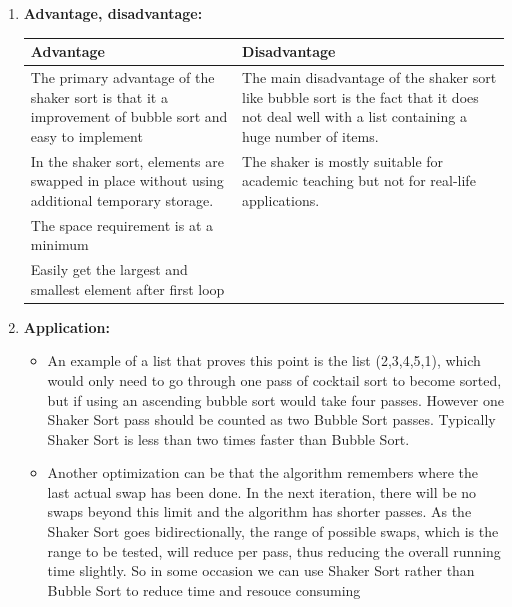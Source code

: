 \documentclass[11pt,a4paper]{article}
\begin{document}
{\begin{enumerate}[label=\textbf{\arabic*})]
\begin{itemize}
                    \item Like most variants of bubble sort, cocktail shaker sort is used primarily as an educational tool. More performant algorithms such as timsort, or merge sort are used by the sorting libraries built into popular programming languages such as Python and Java.
                    \end{itemize}
				\item \textbf{Advantage, disadvantage:}
					\begin{table}[H]
						\centering
						\begin{tabular}{|p{8cm}|p{8cm}|}
							\hline
							\textbf{Advantage} & \textbf{Disadvantage} \\
							\hline
							\hline
							The primary advantage of the shaker sort is that it a improvement of bubble sort and easy to implement & The main disadvantage of the shaker sort like bubble sort is the fact that it does not deal well with a list containing a huge number of items. \\[12pt]
							In the shaker sort, elements are swapped in place without using additional temporary storage. 		   & The shaker is mostly suitable for academic teaching but not for real-life applications.\\[12pt]
							The space requirement is at a minimum & \\[12pt]
							Easily get the largest and smallest element after first loop & \\
							\hline
						\end{tabular}
					\end{table}
				\item \textbf{Application:}	
					\begin{itemize}
						\item An example of a list that proves this point is the list (2,3,4,5,1), which would only need to go through one pass of cocktail sort to become sorted, but if using an ascending bubble sort would take four passes. However one Shaker Sort pass should be counted as two Bubble Sort passes. Typically Shaker Sort is less than two times faster than Bubble Sort.
						\item Another optimization can be that the algorithm remembers where the last actual swap has been done. In the next iteration, there will be no swaps beyond this limit and the algorithm has shorter passes. As the Shaker Sort goes bidirectionally, the range of possible swaps, which is the range to be tested, will reduce per pass, thus reducing the overall running time slightly. So in some occasion we can use Shaker Sort rather than Bubble Sort to reduce time and resouce consuming
					\end{itemize}
			\end{enumerate}
		
}
\end{document}
